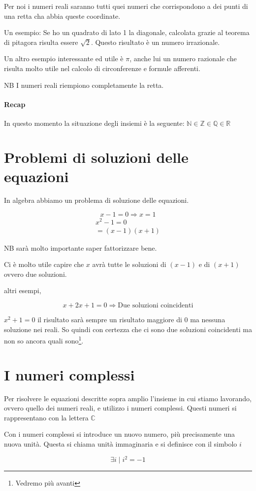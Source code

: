 Per noi i numeri reali saranno tutti quei numeri che corrispondono a dei punti di una retta cha abbia queste coordinate.


Un esempio: Se ho un quadrato di lato 1 la diagonale, calcolata grazie al teorema di pitagora risulta essere $\sqrt{2}$. Questo risultato è un numero irrazionale.

Un altro esempio interessante ed utile è $\pi$, anche lui un numero razionale che risulta molto utile nel calcolo di circonferenze e formule afferenti.

NB I numeri reali riempiono completamente la retta.

\paragraph{Recap}
In questo momento la situazione degli insiemi è la seguente: $ \mathbb{N} \in \mathbb{Z} \in \mathbb{Q} \in \mathbb{R}$

\section{Problemi di soluzioni delle equazioni}

In algebra abbiamo un problema di soluzione delle equazioni.

\[ x-1 = 0 \Rightarrow x = 1 \]
\begin{align*}
    x^2 -1 = 0 \\
           = (x-1)(x+1)
\end{align*}

NB sarà molto importante saper fattorizzare bene.

Ci è molto utile capire che $x$ avrà tutte le soluzioni di $(x-1)$ e di $(x+1)$ ovvero due soluzioni.

altri esempi,

\[ x+2x+1 = 0 \Rightarrow \text{Due soluzioni coincidenti}\]

$x^2 +1  = 0 $ il risultato sarà sempre un risultato maggiore di $0$ ma nessuna soluzione nei reali. So quindi con certezza che ci sono due soluzioni coincidenti ma non so ancora quali sono\footnote{Vedremo più avanti}.

\section{I numeri complessi}

Per risolvere le equazioni descritte sopra amplio l'insieme in cui stiamo lavorando, ovvero quello dei numeri reali, e utilizzo i numeri complessi. Questi numeri si rappresentano con la lettera $\mathbb{C}$

Con i numeri complessi si introduce un nuovo numero, più precisamente una nuova unità. Questa si chiama unità immaginaria e si definisce con il simbolo $i$

\[ \exists i \mid i^2 = -1 \]



